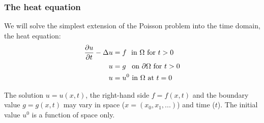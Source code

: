 \begin{frame}
  \frametitle{The heat equation}

  We will solve the simplest extension of the Poisson problem into the
  time domain, the heat equation:
  \begin{align*}
    \frac{\partial u}{\partial t} - \Delta u &= f
    \,\,\mbox{ in } \Omega \hbox{ for } t>0
    \\
    u &= g \,\,\,\mbox{ on } \partial \Omega\hbox{ for } t>0
    \\
    u &= u^0 \mbox{ in } \Omega \mbox{ at } t=0
  \end{align*}

  The solution $u = u(x, t)$, the right-hand side $f = f(x, t)$ and
  the boundary value $g = g(x, t)$ may vary in space ($x = (x_0, x_1,
  ...)$) and time ($t$).  The initial value $u^0$ is a function of
  space only.

\end{frame}
